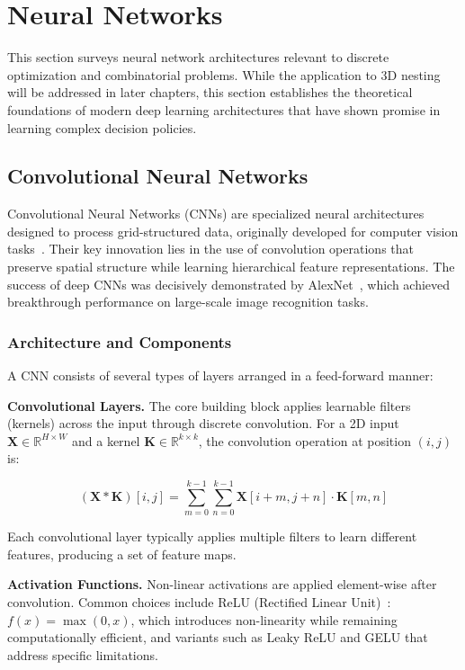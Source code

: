\section{Neural Networks}

This section surveys neural network architectures relevant to discrete optimization and combinatorial problems. While the application to 3D nesting will be addressed in later chapters, this section establishes the theoretical foundations of modern deep learning architectures that have shown promise in learning complex decision policies.

\subsection{Convolutional Neural Networks}

Convolutional Neural Networks (CNNs) are specialized neural architectures designed to process grid-structured data, originally developed for computer vision tasks~\cite{lecun1998gradient}. Their key innovation lies in the use of convolution operations that preserve spatial structure while learning hierarchical feature representations. The success of deep CNNs was decisively demonstrated by AlexNet~\cite{krizhevsky2012imagenet}, which achieved breakthrough performance on large-scale image recognition tasks.

\subsubsection{Architecture and Components}

A CNN consists of several types of layers arranged in a feed-forward manner:

\textbf{Convolutional Layers.} The core building block applies learnable filters (kernels) across the input through discrete convolution. For a 2D input $\mathbf{X} \in \mathbb{R}^{H \times W}$ and a kernel $\mathbf{K} \in \mathbb{R}^{k \times k}$, the convolution operation at position $(i,j)$ is:

\begin{equation}
(\mathbf{X} * \mathbf{K})[i,j] = \sum_{m=0}^{k-1}\sum_{n=0}^{k-1} \mathbf{X}[i+m, j+n] \cdot \mathbf{K}[m,n]
\end{equation}

Each convolutional layer typically applies multiple filters to learn different features, producing a set of feature maps.

\textbf{Activation Functions.} Non-linear activations are applied element-wise after convolution. Common choices include ReLU (Rectified Linear Unit)~\cite{nair2010rectified}: $f(x) = \max(0,x)$, which introduces non-linearity while remaining computationally efficient, and variants such as Leaky ReLU and GELU that address specific limitations.

